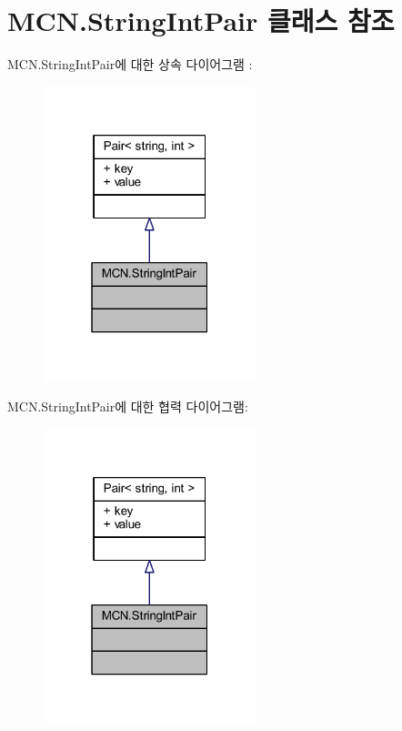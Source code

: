 \hypertarget{class_m_c_n_1_1_string_int_pair}{}\section{M\+C\+N.\+String\+Int\+Pair 클래스 참조}
\label{class_m_c_n_1_1_string_int_pair}


M\+C\+N.\+String\+Int\+Pair에 대한 상속 다이어그램 \+: \nopagebreak
\begin{figure}[H]
\begin{center}
\leavevmode
\includegraphics[width=175pt]{class_m_c_n_1_1_string_int_pair__inherit__graph}
\end{center}
\end{figure}


M\+C\+N.\+String\+Int\+Pair에 대한 협력 다이어그램\+:\nopagebreak
\begin{figure}[H]
\begin{center}
\leavevmode
\includegraphics[width=175pt]{class_m_c_n_1_1_string_int_pair__coll__graph}
\end{center}
\end{figure}
